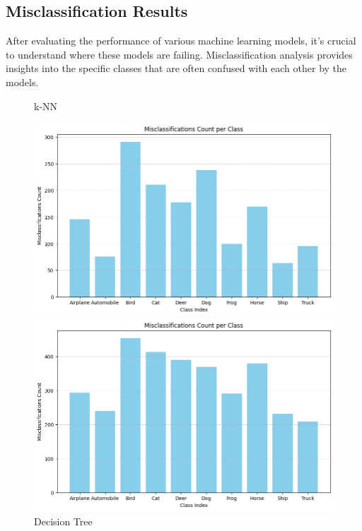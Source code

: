 \documentclass[a4paper]{article}
\theoremstyle{plain}
\theoremstyle{definition}
\begin{document}
\begin{enumerate}
\begin{table}[h!]
{\begin{tabular}{|l|l|}
\end{tabular}%
}
\end{table}
\newpage
\subsection{Misclassification Results}
After evaluating the performance of various machine learning models, it's crucial to understand where these models are failing. Misclassification analysis provides insights into the specific classes that are often confused with each other by the models.
\begin{figure}[h]
    \centering
    \begin{minipage}{0.45\textwidth}
        \centering
        \caption{k-NN}
        \includegraphics[width=\linewidth]{KNN.png}
    \end{minipage}\hfill
    \begin{minipage}{0.45\textwidth}
        \centering
        \caption{Decision Tree}
        \includegraphics[width=\linewidth]{Decision Tree.png}
    \end{minipage}


\end{figure}
\end{enumerate}
\end{document}
